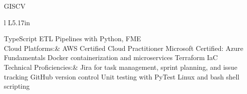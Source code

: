 \documentclass[letterpaper]{article}
\newenvironment{skillslist}
        {
            \hspace*{-0.07in}\begin{tabular}[t]{ l L{5.17in} }
        }{
            \end{tabular}
        }
\newcommand{\impt}[1]{\uline{#1}}
\begin{document}
\begin{taggedblock}{GISCV}
\begin{skillslist}
                TypeScript 
                ETL Pipelines with Python, FME \linebreak
                \\
            Cloud Platforms:&
                AWS Certified Cloud Practitioner \linebreak
                Microsoft Certified: Azure Fundamentals \linebreak
                Docker containerization and microservices \linebreak
                Terraform IaC \linebreak
                \\
            Technical Proficiencies:&
                Jira for task management, sprint planning, and issue tracking \linebreak
                GitHub version control \linebreak
                Unit testing with PyTest \linebreak
                Linux and bash shell scripting \linebreak
                \\

\end{skillslist}
\end{taggedblock}
\end{document}
